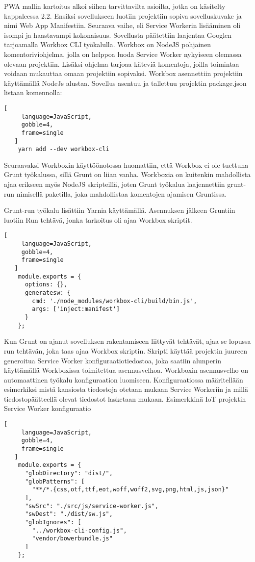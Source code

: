 \documentclass{tktltiki}
\begin{document}
PWA mallin kartoitus alkoi siihen tarvittavilta asioilta, jotka on käsitelty kappaleessa 2.2. Ensiksi sovellukseen luotiin projektiin sopiva sovelluskuvake ja nimi Web App Manifestiin. Seuraava vaihe, eli Service Workerin lisääminen oli isompi ja haastavampi kokonaisuus. Sovellusta päätettiin laajentaa Googlen tarjoamalla Workbox CLI työkalulla. Workbox on NodeJS pohjainen komentoriviohjelma, jolla on helppoa luoda Service Worker nykyiseen olemassa olevaan projektiin. Lisäksi ohjelma tarjoaa käteviä komentoja, joilla toimintaa voidaan mukauttaa omaan projektiin sopivaksi. Workbox asennettiin projektiin käyttämällä NodeJs alustaa. Sovellus asentuu ja tallettuu projektin package.json listaan komennolla: 

\begin{lstlisting}[
     language=JavaScript,
     gobble=4,
     frame=single
   ]
    yarn add --dev workbox-cli
\end{lstlisting}

Seuraavaksi Workboxin käyttöönotossa huomattiin, että Workbox ei ole tuettuna Grunt työkalussa, sillä Grunt on liian vanha. Workboxia on kuitenkin mahdollista ajaa erikseen myös NodeJS skripteillä, joten Grunt työkalua laajennettiin grunt-run nimisellä paketilla, joka mahdollistaa komentojen ajamisen Gruntissa. 

Grunt-run työkalu lisättiin Yarnia käyttämällä. Asennuksen jälkeen Gruntiin luotiin Run tehtävä, jonka tarkoitus oli ajaa Workbox skriptit.

\begin{lstlisting}[
     language=JavaScript,
     gobble=4,
     frame=single
   ]
    module.exports = {
      options: {},
      generatesw: {
        cmd: './node_modules/workbox-cli/build/bin.js',
        args: ['inject:manifest']
      }
    };
\end{lstlisting}

Kun Grunt on ajanut sovelluksen rakentamiseen liittyvät tehtävät, ajaa se lopussa run tehtävän, joka taas ajaa Workbox skriptin. Skripti käyttää projektin juureen generoitua Service Worker konfiguraatiotiedostoa, joka saatiin alunperin käyttämällä Workboxissa toimitettua asennusvelhoa. Workboxin asennusvelho on automaattinen työkalu konfiguraation luomiseen. Konfiguraatiossa määritellään esimerkiksi mistä kansiosta tiedostoja otetaan mukaan Service Workeriin ja millä tiedostopäätteellä olevat tiedostot lasketaan mukaan. Esimerkkinä IoT projektin Service Worker konfiguraatio

\begin{lstlisting}[
     language=JavaScript,
     gobble=4,
     frame=single
   ]
    module.exports = {
      "globDirectory": "dist/",
      "globPatterns": [
        "**/*.{css,otf,ttf,eot,woff,woff2,svg,png,html,js,json}"
      ],
      "swSrc": "./src/js/service-worker.js",
      "swDest": "./dist/sw.js",
      "globIgnores": [
        "../workbox-cli-config.js",
        "vendor/bowerbundle.js"
      ]
    };
\end{lstlisting}
\end{document}
